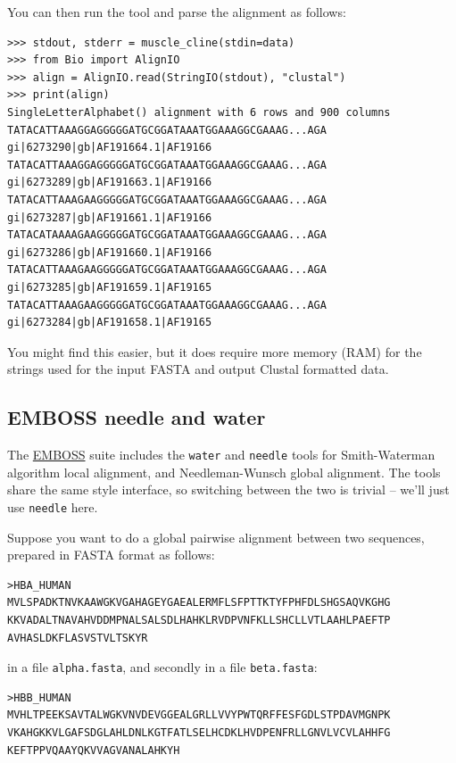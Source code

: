 \documentclass{report}
\begin{document}
\noindent You can then run the tool and parse the alignment as follows:

\begin{verbatim}
>>> stdout, stderr = muscle_cline(stdin=data)
>>> from Bio import AlignIO
>>> align = AlignIO.read(StringIO(stdout), "clustal")
>>> print(align)
SingleLetterAlphabet() alignment with 6 rows and 900 columns
TATACATTAAAGGAGGGGGATGCGGATAAATGGAAAGGCGAAAG...AGA gi|6273290|gb|AF191664.1|AF19166
TATACATTAAAGGAGGGGGATGCGGATAAATGGAAAGGCGAAAG...AGA gi|6273289|gb|AF191663.1|AF19166
TATACATTAAAGAAGGGGGATGCGGATAAATGGAAAGGCGAAAG...AGA gi|6273287|gb|AF191661.1|AF19166
TATACATAAAAGAAGGGGGATGCGGATAAATGGAAAGGCGAAAG...AGA gi|6273286|gb|AF191660.1|AF19166
TATACATTAAAGAAGGGGGATGCGGATAAATGGAAAGGCGAAAG...AGA gi|6273285|gb|AF191659.1|AF19165
TATACATTAAAGAAGGGGGATGCGGATAAATGGAAAGGCGAAAG...AGA gi|6273284|gb|AF191658.1|AF19165
\end{verbatim}

You might find this easier, but it does require more memory (RAM) for the strings
used for the input FASTA and output Clustal formatted data.

\subsection{EMBOSS needle and water}
\label{seq:emboss-needle-water}
The \href{http://emboss.sourceforge.net/}{EMBOSS} suite includes the \texttt{water} and
\texttt{needle} tools for Smith-Waterman algorithm local alignment, and Needleman-Wunsch
global alignment. The tools share the same style interface, so switching between the two
is trivial -- we'll just use \texttt{needle} here.

Suppose you want to do a global pairwise alignment between two sequences, prepared in
FASTA format as follows:

\begin{verbatim}
>HBA_HUMAN
MVLSPADKTNVKAAWGKVGAHAGEYGAEALERMFLSFPTTKTYFPHFDLSHGSAQVKGHG
KKVADALTNAVAHVDDMPNALSALSDLHAHKLRVDPVNFKLLSHCLLVTLAAHLPAEFTP
AVHASLDKFLASVSTVLTSKYR
\end{verbatim}

\noindent in a file \texttt{alpha.fasta}, and secondly in a file \texttt{beta.fasta}:

\begin{verbatim}
>HBB_HUMAN
MVHLTPEEKSAVTALWGKVNVDEVGGEALGRLLVVYPWTQRFFESFGDLSTPDAVMGNPK
VKAHGKKVLGAFSDGLAHLDNLKGTFATLSELHCDKLHVDPENFRLLGNVLVCVLAHHFG
KEFTPPVQAAYQKVVAGVANALAHKYH
\end{verbatim}
\end{document}
